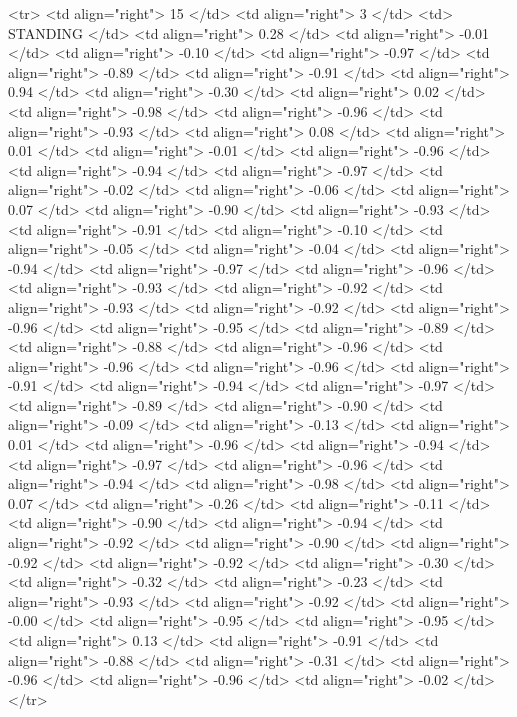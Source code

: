   <tr> <td align="right"> 15 </td> <td align="right">   3 </td> <td> STANDING </td> <td align="right"> 0.28 </td> <td align="right"> -0.01 </td> <td align="right"> -0.10 </td> <td align="right"> -0.97 </td> <td align="right"> -0.89 </td> <td align="right"> -0.91 </td> <td align="right"> 0.94 </td> <td align="right"> -0.30 </td> <td align="right"> 0.02 </td> <td align="right"> -0.98 </td> <td align="right"> -0.96 </td> <td align="right"> -0.93 </td> <td align="right"> 0.08 </td> <td align="right"> 0.01 </td> <td align="right"> -0.01 </td> <td align="right"> -0.96 </td> <td align="right"> -0.94 </td> <td align="right"> -0.97 </td> <td align="right"> -0.02 </td> <td align="right"> -0.06 </td> <td align="right"> 0.07 </td> <td align="right"> -0.90 </td> <td align="right"> -0.93 </td> <td align="right"> -0.91 </td> <td align="right"> -0.10 </td> <td align="right"> -0.05 </td> <td align="right"> -0.04 </td> <td align="right"> -0.94 </td> <td align="right"> -0.97 </td> <td align="right"> -0.96 </td> <td align="right"> -0.93 </td> <td align="right"> -0.92 </td> <td align="right"> -0.93 </td> <td align="right"> -0.92 </td> <td align="right"> -0.96 </td> <td align="right"> -0.95 </td> <td align="right"> -0.89 </td> <td align="right"> -0.88 </td> <td align="right"> -0.96 </td> <td align="right"> -0.96 </td> <td align="right"> -0.96 </td> <td align="right"> -0.91 </td> <td align="right"> -0.94 </td> <td align="right"> -0.97 </td> <td align="right"> -0.89 </td> <td align="right"> -0.90 </td> <td align="right"> -0.09 </td> <td align="right"> -0.13 </td> <td align="right"> 0.01 </td> <td align="right"> -0.96 </td> <td align="right"> -0.94 </td> <td align="right"> -0.97 </td> <td align="right"> -0.96 </td> <td align="right"> -0.94 </td> <td align="right"> -0.98 </td> <td align="right"> 0.07 </td> <td align="right"> -0.26 </td> <td align="right"> -0.11 </td> <td align="right"> -0.90 </td> <td align="right"> -0.94 </td> <td align="right"> -0.92 </td> <td align="right"> -0.90 </td> <td align="right"> -0.92 </td> <td align="right"> -0.92 </td> <td align="right"> -0.30 </td> <td align="right"> -0.32 </td> <td align="right"> -0.23 </td> <td align="right"> -0.93 </td> <td align="right"> -0.92 </td> <td align="right"> -0.00 </td> <td align="right"> -0.95 </td> <td align="right"> -0.95 </td> <td align="right"> 0.13 </td> <td align="right"> -0.91 </td> <td align="right"> -0.88 </td> <td align="right"> -0.31 </td> <td align="right"> -0.96 </td> <td align="right"> -0.96 </td> <td align="right"> -0.02 </td> </tr>
